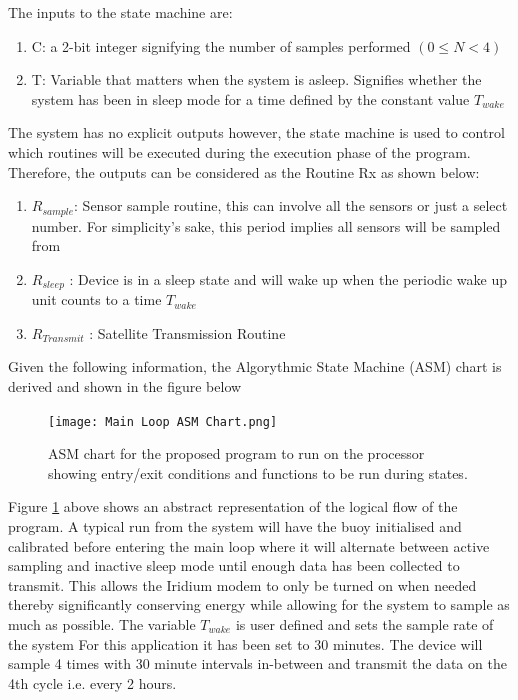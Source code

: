 The inputs to the state machine are:
\begin{enumerate}
    \item C: a 2-bit integer signifying the number of samples performed $(0 \leq N <4)$
    \item T: Variable that matters when the system is asleep. Signifies whether the system has been in sleep mode for a time defined by the constant value $T_{wake}$
\end{enumerate}

The system has no explicit outputs however, the state machine is used to control which routines will be executed during the execution phase of the program. Therefore, the outputs can be considered as the Routine Rx as shown below:
\begin{enumerate}
    \item $R_{sample}$: Sensor sample routine, this can involve all the sensors or just a select number. For simplicity's sake, this period implies all sensors will be sampled from
    \item $R_{sleep}$ : Device is in a sleep state and will wake up when the periodic wake up unit counts to a time $T_{wake}$
    \item $R_{Transmit}$ : Satellite Transmission Routine
\end{enumerate}

Given the following information, the Algorythmic State Machine (ASM) chart is derived and shown in the figure below

\begin{figure}[H]
    \centering
    \texttt{[image: Main Loop ASM Chart.png]}
    \caption{ASM chart for the proposed program to run on the processor showing entry/exit conditions and functions to be run during states.}
    \label{fig:ASM_chart}
\end{figure}

Figure \ref{fig:ASM_chart} above shows an abstract representation of the logical flow of the program. A typical run from the system will have the buoy initialised and calibrated before entering the main loop where it will alternate between active sampling and inactive sleep mode until enough data has been collected to transmit. This allows the Iridium modem to only be turned on when needed thereby significantly conserving energy while allowing for the system to sample as much as possible. The variable $T_{wake}$ is user defined and sets the sample rate of the system For this application it has been set to 30 minutes. The device will sample 4 times with 30 minute intervals in-between and transmit the data on the 4th cycle i.e. every 2 hours.

